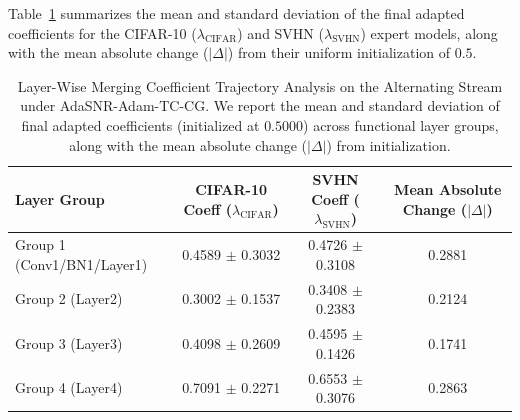 \documentclass{article}
\theoremstyle{plain}
\theoremstyle{definition}
\theoremstyle{remark}
\begin{document}
Table~\ref{tab:layer_trajectories} summarizes the mean and standard deviation of the final adapted coefficients for the CIFAR-10 ($\lambda_{\text{CIFAR}}$) and SVHN ($\lambda_{\text{SVHN}}$) expert models, along with the mean absolute change ($|\Delta|$) from their uniform initialization of $0.5$.

\begin{table}[t]
\caption{Layer-Wise Merging Coefficient Trajectory Analysis on the Alternating Stream under AdaSNR-Adam-TC-CG. We report the mean and standard deviation of final adapted coefficients (initialized at $0.5000$) across functional layer groups, along with the mean absolute change ($|\Delta|$) from initialization.}
\label{tab:layer_trajectories}
\vskip 0.15in
\begin{center}
\begin{small}
\begin{tabular}{lccc}
\toprule
\textbf{Layer Group} & \textbf{CIFAR-10 Coeff ($\lambda_{\text{CIFAR}}$)} & \textbf{SVHN Coeff ($\lambda_{\text{SVHN}}$)} & \textbf{Mean Absolute Change ($|\Delta|$)} \\
\midrule
Group 1 (Conv1/BN1/Layer1) & 0.4589 $\pm$ 0.3032 & 0.4726 $\pm$ 0.3108 & 0.2881 \\
Group 2 (Layer2)           & 0.3002 $\pm$ 0.1537 & 0.3408 $\pm$ 0.2383 & 0.2124 \\
Group 3 (Layer3)           & 0.4098 $\pm$ 0.2609 & 0.4595 $\pm$ 0.1426 & 0.1741 \\
Group 4 (Layer4)           & 0.7091 $\pm$ 0.2271 & 0.6553 $\pm$ 0.3076 & 0.2863 \\
\bottomrule
\end{tabular}
\end{small}
\end{center}
\vskip -0.1in
\end{table}
\end{document}
